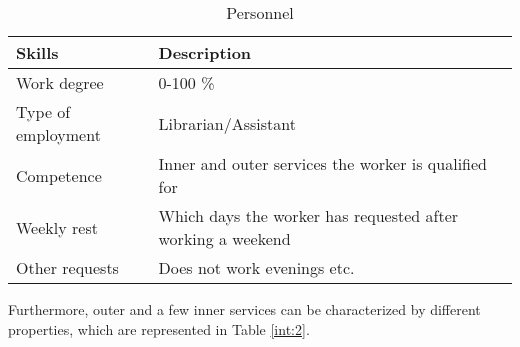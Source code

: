 \begin{table}[h]
\centering
\caption{Personnel}
\label{int:1}
\begin{tabular}{|l|l|}
\hline 
\textbf{Skills} & \textbf{Description} \\ \hline
Work degree & 0-100 \% 
\\ \hline 
Type of employment & Librarian/Assistant
\\ \hline 
Competence & Inner and outer services the worker is qualified for  
\\ \hline 
Weekly rest & Which days the worker has requested after working a weekend
\\ \hline 
Other requests & Does not work evenings etc.
\\ \hline 
\end{tabular}
\end{table} 

Furthermore, outer and a few inner services can be characterized by different properties, which are represented in Table \ref{int:2}. \\

